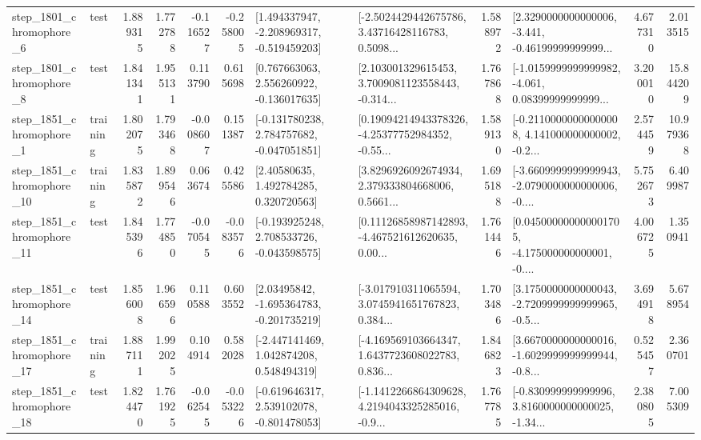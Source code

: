 \begin{tabular}{llrrrrllrlrr}
  step\_1801\_chromophore\_6 &      test &      1.889315 &    1.772788 &     -0.116527 & -0.258005 &   [1.494337947, -2.208969317, -0.519459203] &  [-2.5024429442675786, 3.43716428116783, 0.5098... &       1.588972 &  [2.3290000000000006, -3.441, -0.46199999999999... &            4.677310 &          2.013515 \\
  step\_1801\_chromophore\_8 &      test &      1.841341 &    1.955131 &      0.113790 &  0.615698 &    [0.767663063, 2.556260922, -0.136017635] &  [2.103001329615453, 3.7009081123558443, -0.314... &       1.767868 &  [-1.0159999999999982, -4.061, 0.08399999999999... &            3.200010 &         15.844209 \\
  step\_1851\_chromophore\_1 &  training &      1.802075 &    1.793468 &     -0.008607 &  0.151387 &   [-0.131780238, 2.784757682, -0.047051851] &  [0.19094214943378326, -4.25377752984352, -0.55... &       1.589130 &  [-0.21100000000000008, 4.141000000000002, -0.2... &            2.574459 &         10.979368 \\
 step\_1851\_chromophore\_10 &  training &      1.835872 &    1.899546 &      0.063674 &  0.425586 &      [2.40580635, 1.492784285, 0.320720563] &  [3.8296926092674934, 2.379333804668006, 0.5661... &       1.695188 &  [-3.6609999999999943, -2.0790000000000006, -0.... &            5.752673 &          6.409987 \\
 step\_1851\_chromophore\_11 &      test &      1.845396 &    1.774850 &     -0.070545 & -0.083576 &   [-0.193925248, 2.708533726, -0.043598575] &  [0.11126858987142893, -4.467521612620635, 0.00... &       1.761446 &  [0.045000000000001705, -4.175000000000001, -0.... &            4.006725 &          1.350941 \\
 step\_1851\_chromophore\_14 &      test &      1.856008 &    1.966596 &      0.110588 &  0.603552 &    [2.03495842, -1.695364783, -0.201735219] &  [-3.017910311065594, 3.0745941651767823, 0.384... &       1.703486 &  [3.1750000000000043, -2.7209999999999965, -0.5... &            3.694918 &          5.678954 \\
 step\_1851\_chromophore\_17 &  training &      1.887111 &    1.992025 &      0.104914 &  0.582028 &    [-2.447141469, 1.042874208, 0.548494319] &  [-4.169569103664347, 1.6437723608022783, 0.836... &       1.846823 &  [3.6670000000000016, -1.6029999999999944, -0.8... &            0.525457 &          2.360701 \\
 step\_1851\_chromophore\_18 &      test &      1.824470 &    1.761925 &     -0.062545 & -0.053226 &   [-0.619646317, 2.539102078, -0.801478053] &  [-1.1412266864309628, 4.2194043325285016, -0.9... &       1.767785 &  [-0.830999999999996, 3.8160000000000025, -1.34... &            2.380805 &          7.005309 \\

\end{tabular}
